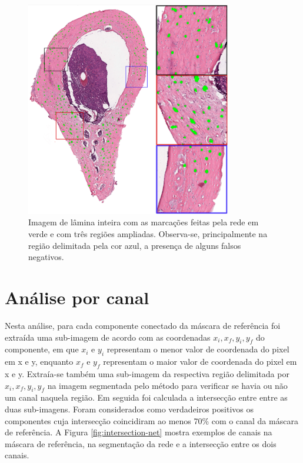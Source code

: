 \begin{figure}[H]
    \center
    \includegraphics[width=0.8\textwidth]{figures/4_results/302areas_reduzida.png}
   
  
    \caption[Imagem marcada pela rede com regiões ampliadas]{Imagem de lâmina inteira com as marcações feitas pela rede em verde e com três regiões ampliadas. Observa-se, principalmente na região delimitada pela cor azul, a presença de alguns falsos negativos.}
    \label{fig:marcacoes-final-regioes}
\end{figure}
\section{Análise por canal}

Nesta análise, para cada componente conectado da máscara de referência foi extraída uma sub-imagem de acordo com as coordenadas \(x_i, x_f, y_i, y_f\) do componente, em que $x_i$  e $y_i$ representam o menor valor de coordenada do pixel em x e y,  enquanto $x_f$ e $y_f$ representam o maior valor de coordenada do pixel em x e y. Extraía-se também uma sub-imagem da respectiva região delimitada por \(x_i, x_f, y_i, y_f\) na imagem segmentada pelo método para verificar se havia ou não um canal naquela região. Em seguida foi calculada a intersecção entre entre as duas sub-imagens. Foram considerados como verdadeiros positivos os componentes cuja intersecção coincidiram ao menos 70\% com o canal da máscara de referência. A Figura \ref{fig:intersection-net} mostra exemplos de canais na máscara de referência, na segmentação da rede e a intersecção entre os dois canais. 

